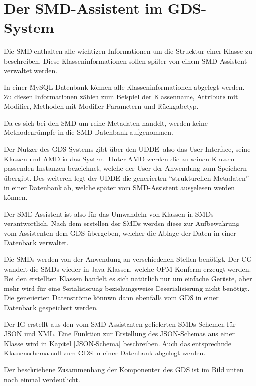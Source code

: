 \section{Der SMD-Assistent im GDS-System}
Die \ac{SMD} enthalten alle wichtigen Informationen um die Strucktur einer Klasse zu beschreiben. Diese Klasseninformationen sollen sp\"ater von einem SMD-Assistent verwaltet werden.

In einer MySQL-Datenbank k\"onnen alle Klasseninformationen abgelegt werden. Zu diesen Informationen z\"ahlen zum Beispiel der Klassenname, Attribute mit Modifier, Methoden mit Modifier Parametern und R\"uckgabetyp. 

Da es sich bei den \ac{SMD} um reine Metadaten handelt, werden keine Methodenr\"umpfe in die \ac{SMD}-Datenbank aufgenommen.

Der Nutzer des \ac{GDS}-Systems gibt \"uber den \ac{UDDE}, also das User Interface, seine Klassen und \ac{AMD} in das System.
Unter \ac{AMD} werden die zu seinen Klassen passenden Instanzen bezeichnet, welche der User der Anwendung zum Speichern \"ubergibt.
Des weiteren legt der \ac{UDDE} die generierten "`strukturellen Metadaten"' in einer Datenbank ab, welche sp\"ater vom SMD-Assistent ausgelesen werden k\"onnen.

Der SMD-Assistent ist also f\"ur das Umwandeln von Klassen in \ac{SMD}s verantwortlich. Nach dem erstellen der \ac{SMD}s werden diese zur Aufbewahrung vom Assistenten dem \ac{GDS} \"ubergeben, welcher die Ablage der Daten in einer Datenbank verwaltet.

Die \ac{SMD}s werden von der Anwendung an verschiedenen Stellen ben\"otigt. Der \ac{CG} wandelt die \ac{SMD}s wieder in Java-Klassen, welche OPM-Konform erzeugt werden. Bei den erstellten Klassen handelt es sich nat\"urlich nur um einfache Ger\"uste, aber mehr wird f\"ur eine Serialisierung beziehungsweise Deserialisierung nicht ben\"otigt.
Die generierten Datenstr\"ome k\"onnwn dann ebenfalls vom \ac{GDS} in einer Datenbank gespeichert werden.

Der \ac{IG} erstellt aus den vom SMD-Assistenten gelieferten \ac{SMD}s Schemen f\"ur JSON und XML. Eine Funktion zur Erstellung des JSON-Schemas aus einer Klasse wird in Kapitel \ref{JSON-Schema} beschreiben.
Auch das entsprechnde Klassenschema soll vom \ac{GDS} in einer Datenbank abgelegt werden.

Der beschriebene Zusammenhang der Komponenten des \ac{GDS} ist im Bild unten noch einmal verdeutlicht.


